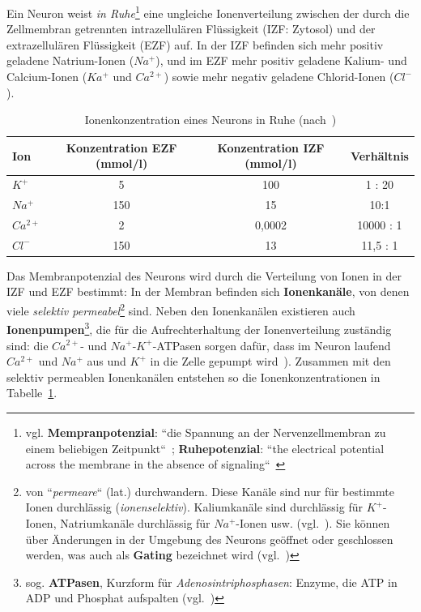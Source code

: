 Ein Neuron weist \textit{in Ruhe}\footnote{
 vgl. \textbf{Mempranpotenzial}: ``die Spannung an der Nervenzellmembran zu einem beliebigen Zeitpunkt``~\cite[70]{BCP18}; \textbf{Ruhepotenzial}: ``the electrical potential across the membrane in the absence of signaling``~\cite[126]{KSJ+13}
} eine ungleiche Ionenverteilung zwischen der durch die Zellmembran getrennten intrazellulären Flüssigkeit (IZF: Zytosol) und der extrazellulären Flüssigkeit (EZF) auf.
In der IZF befinden sich mehr positiv geladene Natrium-Ionen ($Na^+$), und im EZF mehr positiv geladene Kalium- und Calcium-Ionen ($Ka^+$ und $Ca^{2+}$) sowie mehr negativ geladene Chlorid-Ionen ($Cl^-$).

{\renewcommand{\arraystretch}{1.5}%
\begin{table} %
 \centering
 \begin{tabular}{l | c | c | c }
  \textbf{Ion} & \textbf{Konzentration EZF (mmol/l)} & \textbf{Konzentration IZF (mmol/l)} & \textbf{Verhältnis} \\
  \hline
  $K^+$      & 5 & 100 & 1 : 20 \\
  $Na^+$     & 150 & 15 & 10:1 \\
  $Ca^{2+}$  & 2 & 0,0002 & 10000 : 1 \\
  $Cl^-$     & 150 & 13 & 11,5 : 1 \\
 \end{tabular}
 \caption{Ionenkonzentration eines Neurons in Ruhe (nach~\cite[75, Abb. 3.15]{BCP18})}
 \label{tab:ionenkonzentration}
\end{table}


Das Membranpotenzial des Neurons wird durch die Verteilung von Ionen in der IZF und EZF bestimmt: In der Membran befinden sich \textbf{Ionenkanäle}, von denen viele \textit{selektiv permeabel}\footnote{
 von ``\textit{permeare}`` (lat.) durchwandern. Diese Kanäle sind nur für bestimmte Ionen durchlässig (\textit{ionenselektiv}). Kaliumkanäle sind durchlässig für $K^+$-Ionen, Natriumkanäle durchlässig für $Na^+$-Ionen usw. (vgl.~\cite[66]{BCP18}).
 Sie können über Änderungen in der Umgebung des Neurons geöffnet oder geschlossen werden, was auch als \textbf{Gating} bezeichnet wird (vgl.~\cite[108]{KSJ+13})
} sind.
Neben den Ionenkanälen existieren auch \textbf{Ionenpumpen}\footnote{
 sog. \textbf{ATPasen}, Kurzform für \textit{Adenosintriphosphasen}: Enzyme, die ATP in ADP und Phosphat aufspalten (vgl.~\cite[26]{SD07})
}, die für die Aufrechterhaltung der Ionenverteilung zuständig sind: die $Ca^{2+}$- und $Na^+$-$K^+$-ATPasen sorgen dafür, dass im Neuron laufend  $Ca^{2+}$ und $Na^+$ aus und $K^+$ in die Zelle gepumpt wird~\cite[44]{SD07}).
Zusammen mit den selektiv permeablen Ionenkanälen entstehen so die Ionenkonzentrationen in Tabelle~\ref{tab:ionenkonzentration}.\\


}
